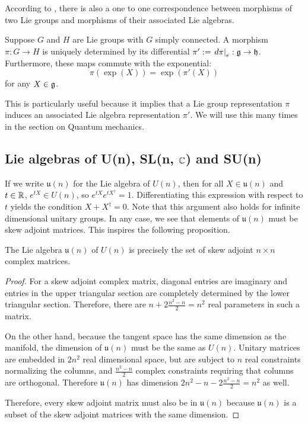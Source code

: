 \documentclass[a4paper]{article}
\begin{document}
According to \cite{fulton_harris}, there is also a one to one correspondence between morphisms of two Lie groups and morphisms of their associated Lie algebras.

\begin{prop}
    Suppose $G$ and $H$ are Lie groups with $G$ simply connected. A morphism $\pi: G \to H$ is uniquely determined by its differential $\pi' := \left. d\pi \right|_e : \mathfrak{g} \to \mathfrak{h}$. Furthermore, these maps commute with the exponential: 
    $$\pi(\exp(X)) = \exp(\pi'(X))$$
    for any $X \in \mathfrak{g}$.
\end{prop}

This is particularly useful because it implies that a Lie group representation $\pi$ induces an associated Lie algebra representation $\pi'$. We will use this many times in the section on Quantum mechanics.

\subsection{Lie algebras of U(n), SL(n, \texorpdfstring{$\mathbb{C}$}{C}) and SU(n)}

If we write $\mathfrak{u}(n)$ for the Lie algebra of $U(n)$, then for all $X \in \mathfrak{u}(n)$ and $t \in \mathbb{R}$, $e^{tX} \in U(n)$, so $e^{tX}e^{tX^\dagger} = 1$. Differentiating this expression with respect to $t$ yields the condition $X + X^\dagger = 0$. Note that this argument also holds for infinite dimensional unitary groups. In any case, we see that elements of $\mathfrak{u}(n)$ must be skew adjoint matrices. This inspires the following proposition. 

\begin{prop}
    The Lie algebra $\mathfrak{u}(n)$ of $U(n)$ is precisely the set of skew adjoint $n \times n$ complex matrices.
\end{prop}

\begin{proof}
    For a skew adjoint complex matrix, diagonal entries are imaginary and entries in the upper triangular section are completely determined by the lower triangular section. Therefore, there are $n + 2 \frac{n^2 - n }{2} = n^2$ real parameters in such a matrix.

    On the other hand, because the tangent space has the same dimension as the manifold, the dimension of $\mathfrak{u}(n)$ must be the same as $U(n)$. Unitary matrices are embedded in $2n^2$ real dimensional space, but are subject to $n$ real constraints normalizing the columns, and $\frac{n^2 - n }{2}$ complex constraints requiring that columns are orthogonal. Therefore $\mathfrak{u}(n)$ has dimension $2n^2 - n - 2 \frac{n^2 - n }{2} = n^2$ as well. 
    
    Therefore, every skew adjoint matrix must also be in $\mathfrak{u}(n)$ because $\mathfrak{u}(n)$ is a subset of the skew adjoint matrices with the same dimension.
\end{proof}
\end{document}
